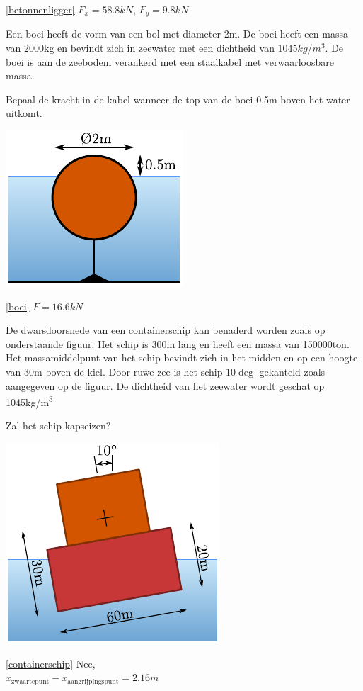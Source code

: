 \begin{antwoord}{\ref{betonnenligger}}
	$F_x = 58.8\unit{kN}$, $F_y = 9.8\unit{kN}$
\end{antwoord}
\begin{toepassing}
	\label{boei}
Een boei heeft de vorm van een bol met diameter 2m. De boei heeft een massa van 2000kg en bevindt zich in zeewater met een dichtheid van $1045\unit{kg/m^3}$. De boei is aan de zeebodem verankerd met een staalkabel met verwaarloosbare massa.
		
Bepaal de kracht in de kabel wanneer de top van de boei 0.5m boven het water uitkomt.

	\centering
	\includegraphics{fig/hydrostatica/boei}
\end{toepassing}
\begin{antwoord}{\ref{boei}}
	$F = 16.6\unit{kN}$ 
\end{antwoord}
\begin{toepassing}
	\label{containerschip}
De dwarsdoorsnede van een containerschip kan benaderd worden zoals op onderstaande figuur. Het schip is 300m lang en heeft een massa van 150000ton. Het massamiddelpunt van het schip bevindt zich in het midden en op een hoogte van 30m boven de kiel. Door ruwe zee is het schip $10\deg$ gekanteld zoals aangegeven op de figuur. De dichtheid van het zeewater wordt geschat op 1045\unit{kg/m^3}
		
Zal het schip kapseizen?
		
	\centering
	\includegraphics{fig/hydrostatica/containerschip}
\end{toepassing}
\begin{antwoord}{\ref{containerschip}}
	Nee,\\ $x_\text{zwaartepunt}-x_\text{aangrijpingspunt} = 2.16\unit{m}$
\end{antwoord}
	
